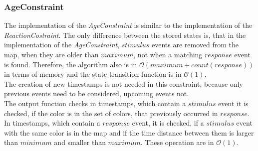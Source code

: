 \subsubsection{AgeConstraint}
	The implementation of the \emph{AgeConstraint} is similar to the implementation of the \emph{ReactionCostraint}. The only difference between the stored states is, that in the implementation of the \emph{AgeConstraint}, $stimulus$ events are removed from the map, when they are older than $maximum$, not when a matching $response$ event is found. Therefore, the algorithm also is in $\mathcal{O}(maximum+count(response))$ in terms of memory and the state transition function is in $\mathcal{O}(1)$.\\
	The creation of new timestamps is not needed in this constraint, because only previous events need to be considered, upcoming events not.\\
	The output function checks in timestamps, which contain a $stimulus$ event it is checked, if the color is in the set of colors, that previously occurred in $response$. In timestamps, which contain a $response$ event, it is checked, if a $stimulus$ event with the same color is in the map and if the time distance between them is larger than $minimum$ and smaller than $maximum$. These operation are in $\mathcal{O}(1)$.

